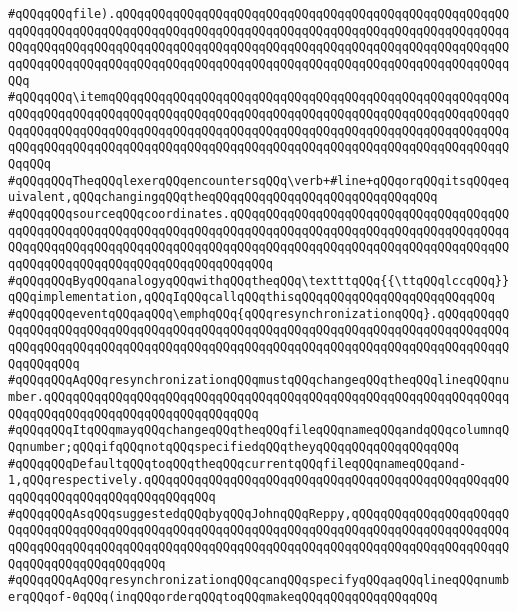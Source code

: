 \verb|#qQQqqQQqfile).qQQqqQQqqQQqqQQqqQQqqQQqqQQqqQQqqQQqqQQqqQQqqQQqqQQqqQQqqQQqqQQqqQQqqQQqqQQqqQQqqQQqqQQqqQQqqQQqqQQqqQQqqQQqqQQqqQQqqQQqqQQqqQQqqQQqqQQqqQQqqQQqqQQqqQQqqQQqqQQqqQQqqQQqqQQqqQQqqQQqqQQqqQQqqQQqqQQqqQQqqQQqqQQqqQQqqQQqqQQqqQQqqQQqqQQqqQQqqQQqqQQqqQQqqQQqqQQqqQQqqQQqqQQq|\newline
\verb|#qQQqqQQq\itemqQQqqQQqqQQqqQQqqQQqqQQqqQQqqQQqqQQqqQQqqQQqqQQqqQQqqQQqqQQqqQQqqQQqqQQqqQQqqQQqqQQqqQQqqQQqqQQqqQQqqQQqqQQqqQQqqQQqqQQqqQQqqQQqqQQqqQQqqQQqqQQqqQQqqQQqqQQqqQQqqQQqqQQqqQQqqQQqqQQqqQQqqQQqqQQqqQQqqQQqqQQqqQQqqQQqqQQqqQQqqQQqqQQqqQQqqQQqqQQqqQQqqQQqqQQqqQQqqQQqqQQqqQQqqQQq|\newline
\verb|#qQQqqQQqTheqQQqlexerqQQqencountersqQQq\verb+#line+qQQqorqQQqitsqQQqequivalent,qQQqchangingqQQqtheqQQqqQQqqQQqqQQqqQQqqQQqqQQqqQQq|\newline
\verb|#qQQqqQQqsourceqQQqcoordinates.qQQqqQQqqQQqqQQqqQQqqQQqqQQqqQQqqQQqqQQqqQQqqQQqqQQqqQQqqQQqqQQqqQQqqQQqqQQqqQQqqQQqqQQqqQQqqQQqqQQqqQQqqQQqqQQqqQQqqQQqqQQqqQQqqQQqqQQqqQQqqQQqqQQqqQQqqQQqqQQqqQQqqQQqqQQqqQQqqQQqqQQqqQQqqQQqqQQqqQQqqQQqqQQqqQQqqQQq|\newline
\verb|#qQQqqQQqByqQQqanalogyqQQqwithqQQqtheqQQq\textttqQQq{{\ttqQQqlccqQQq}}qQQqimplementation,qQQqIqQQqcallqQQqthisqQQqqQQqqQQqqQQqqQQqqQQqqQQq|\newline
\verb|#qQQqqQQqeventqQQqaqQQq\emphqQQq{qQQqresynchronizationqQQq}.qQQqqQQqqQQqqQQqqQQqqQQqqQQqqQQqqQQqqQQqqQQqqQQqqQQqqQQqqQQqqQQqqQQqqQQqqQQqqQQqqQQqqQQqqQQqqQQqqQQqqQQqqQQqqQQqqQQqqQQqqQQqqQQqqQQqqQQqqQQqqQQqqQQqqQQqqQQqqQQq|\newline
\verb|#qQQqqQQqAqQQqresynchronizationqQQqmustqQQqchangeqQQqtheqQQqlineqQQqnumber.qQQqqQQqqQQqqQQqqQQqqQQqqQQqqQQqqQQqqQQqqQQqqQQqqQQqqQQqqQQqqQQqqQQqqQQqqQQqqQQqqQQqqQQqqQQqqQQqqQQq|\newline
\verb|#qQQqqQQqItqQQqmayqQQqchangeqQQqtheqQQqfileqQQqnameqQQqandqQQqcolumnqQQqnumber;qQQqifqQQqnotqQQqspecifiedqQQqtheyqQQqqQQqqQQqqQQqqQQq|\newline
\verb|#qQQqqQQqDefaultqQQqtoqQQqtheqQQqcurrentqQQqfileqQQqnameqQQqand-1,qQQqrespectively.qQQqqQQqqQQqqQQqqQQqqQQqqQQqqQQqqQQqqQQqqQQqqQQqqQQqqQQqqQQqqQQqqQQqqQQqqQQqqQQq|\newline
\verb|#qQQqqQQqAsqQQqsuggestedqQQqbyqQQqJohnqQQqReppy,qQQqqQQqqQQqqQQqqQQqqQQqqQQqqQQqqQQqqQQqqQQqqQQqqQQqqQQqqQQqqQQqqQQqqQQqqQQqqQQqqQQqqQQqqQQqqQQqqQQqqQQqqQQqqQQqqQQqqQQqqQQqqQQqqQQqqQQqqQQqqQQqqQQqqQQqqQQqqQQqqQQqqQQqqQQqqQQqqQQqqQQq|\newline
\verb|#qQQqqQQqAqQQqresynchronizationqQQqcanqQQqspecifyqQQqaqQQqlineqQQqnumberqQQqof-0qQQq(inqQQqorderqQQqtoqQQqmakeqQQqqQQqqQQqqQQqqQQq|\newline
